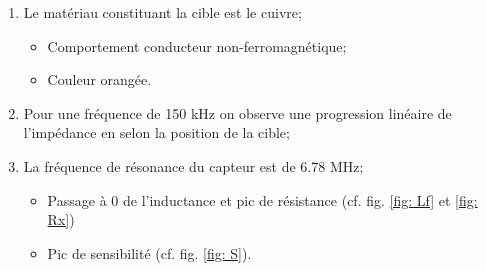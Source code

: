 \begin{enumerate}
    \item Le matériau constituant la cible est le cuivre;
    \begin{itemize}
        \item Comportement conducteur non-ferromagnétique;
        \item Couleur orangée.
    \end{itemize}
    \item Pour une fréquence de 150 kHz on observe une progression linéaire de l'impédance en selon
    la position de la cible;
    \item La fréquence de résonance du capteur est de 6.78 MHz;
    \begin{itemize}
        \item Passage à 0 de l'inductance et pic de résistance (cf. fig. \ref{fig: Lf} et \ref{fig: Rx})
        \item Pic de sensibilité (cf. fig. \ref{fig: S}). 
    \end{itemize}
\end{enumerate}

